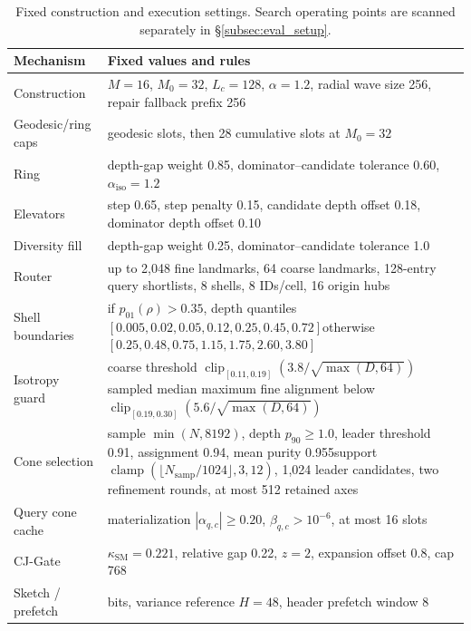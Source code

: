 \begin{table}[t]
 \centering
 \caption{Fixed construction and execution settings. Search operating points are scanned separately in \S\ref{subsec:eval_setup}.}
 \label{tab:fixed_parameters}
 \small
 \begin{tabularx}{\textwidth}{@{}l>{\raggedright\arraybackslash}X@{}}
 \toprule
 Mechanism & Fixed values and rules\\
 \midrule
 Construction & $M=16$, $M_0=32$, $L_c=128$, $\alpha=1.2$, radial wave size 256, repair fallback prefix 256\\
 Geodesic/ring caps & 12 geodesic slots, then 28 cumulative slots at $M_0=32$\\
 Ring & depth-gap weight 0.85, dominator--candidate tolerance 0.60, $\alpha_{\mathrm{iso}}=1.2$\\
 Elevators & step 0.65, step penalty 0.15, candidate depth offset 0.18, dominator depth offset 0.10\\
 Diversity fill & depth-gap weight 0.25, dominator--candidate tolerance 1.0\\
 Router & up to 2,048 fine landmarks, 64 coarse landmarks, 128-entry query shortlists, 8 shells, 8 IDs/cell, 16 origin hubs\\
 Shell boundaries & if $p_{01}(\rho)>0.35$, depth quantiles $[0.005,0.02,0.05,0.12,0.25,0.45,0.72]$\newline otherwise $[0.25,0.48,0.75,1.15,1.75,2.60,3.80]$\\
 Isotropy guard & coarse threshold $\operatorname{clip}_{[0.11,0.19]}(3.8/\sqrt{\max(D,64)})$\newline sampled median maximum fine alignment below $\operatorname{clip}_{[0.19,0.30]}(5.6/\sqrt{\max(D,64)})$\\
 Cone selection & sample $\min(N,8192)$, depth $p_{90}\ge1.0$, leader threshold 0.91, assignment 0.94, mean purity 0.955\newline support $\operatorname{clamp}(\lfloor N_{\mathrm{samp}}/1024\rfloor,3,12)$, 1,024 leader candidates, two refinement rounds, at most 512 retained axes\\
 Query cone cache & materialization $|\alpha_{q,c}|\ge0.20$, $\beta_{q,c}>10^{-6}$, at most 16 slots\\
 CJ-Gate & $\kappa_{\mathrm{SM}}=0.221$, relative gap 0.22, $z=2$, expansion offset 0.8, cap 768\\
 Sketch / prefetch & 256 bits, variance reference $H=48$, header prefetch window 8\\
 \bottomrule
 \end{tabularx}
\end{table}
